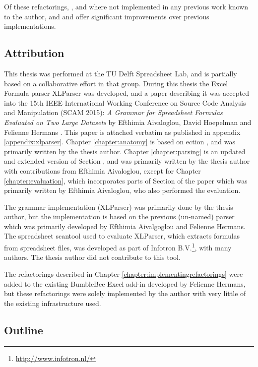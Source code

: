 Of these refactorings, ,  and  where not implemented in any previous work known to the author, and  and  offer significant improvements over previous implementations.

\subsection{Attribution}

This thesis was performed at the TU Delft Spreadsheet Lab, and is partially based on a collaborative effort in that group.
During this thesis the Excel Formula parser XLParser was developed, and a paper describing it was accepted into the 15th IEEE International Working Conference on Source Code Analysis and Manipulation (SCAM 2015): \emph{A Grammar for Spreadsheet Formulas Evaluated on Two Large Datasets} by Efthimia Aivaloglou, David Hoepelman and Felienne Hermans \cite{xlparser}.
This paper is attached verbatim as published in appendix \ref{appendix:xlparser}.
Chapter \ref{chapter:anatomy} is based on ection , and was primarily written by the thesis author.
Chapter \ref{chapter:parsing} is an updated and extended version of Section , and was primarily written by the thesis author with contributions from Efthimia Aivaloglou, except for Chapter \ref{chapter:evaluation}, which incorporates parts of Section  of the paper which was primarily written by Efthimia Aivaloglou, who also performed the evaluation. 

The grammar implementation (XLParser) was primarily done by the thesis author, but the implementation is based on the previous (un-named) parser which was primarily developed by Efthimia Aivalgoglou and Felienne Hermans.
The spreadsheet scantool used to evaluate XLParser, which extracts formulas from spreadsheet files, was developed as part of Infotron B.V.\footnote{\url{http://www.infotron.nl/}}, with many authors. The thesis author did not contribute to this tool.

The refactorings described in Chapter \ref{chapter:implementingrefactorings} were added to the existing BumbleBee Excel add-in developed by Felienne Hermans, but these refactorings were solely implemented by the author with very little of the existing infrastructure used.

\subsection{Outline}

